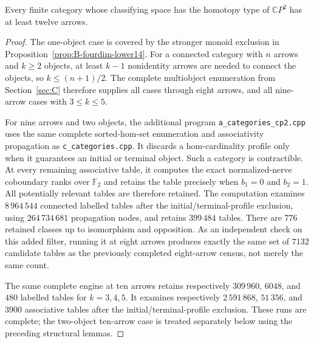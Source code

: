 \begin{proposition}
\label{C:CP2-lower10}
\label{C:CP2-lower11}
\label{C:CP2-lower12}
Every finite category whose classifying space has the homotopy type of
$\mathbb CP^2$ has at least twelve arrows.
\end{proposition}
\begin{proof}
The one-object case is covered by the stronger monoid exclusion in
Proposition~\ref{prop:B-fourdim-lower14}. For a connected category with
$n$ arrows and $k\geq2$ objects, at least $k-1$ nonidentity arrows are
needed to connect the objects, so $k\leq(n+1)/2$. The complete
multiobject enumeration from Section~\ref{sec:C} therefore supplies
all cases through eight arrows, and all nine-arrow cases with
$3\leq k\leq5$.

For nine arrows and two objects, the additional program
\texttt{a\_categories\_cp2.cpp} uses the same complete sorted-hom-set
enumeration and associativity propagation as
\texttt{c\_categories.cpp}. It discards a hom-cardinality profile only
when it guarantees an initial or terminal object. Such a category is
contractible. At every remaining associative table, it computes the
exact normalized-nerve coboundary ranks over $\mathbb F_2$ and retains
the table precisely when $b_1=0$ and $b_2=1$. All potentially relevant
tables are therefore retained. The computation examines $8\,964\,544$
connected labelled tables after the initial/terminal-profile exclusion,
using $264\,734\,681$ propagation nodes, and retains $399\,484$ tables.
There are $776$ retained classes up to isomorphism and opposition.
As an independent check on this added filter, running it at eight arrows
produces exactly the same set of $7132$ candidate tables as the previously
completed eight-arrow census, not merely the same count.

The same complete engine at ten arrows retains respectively
$309\,960$, $6048$, and $480$ labelled tables for $k=3,4,5$.
It examines respectively $2\,591\,868$, $51\,356$, and $3900$
associative tables after the initial/terminal-profile exclusion.
These runs are complete; the two-object ten-arrow case is treated
separately below using the preceding structural lemmas.


\end{proof}
